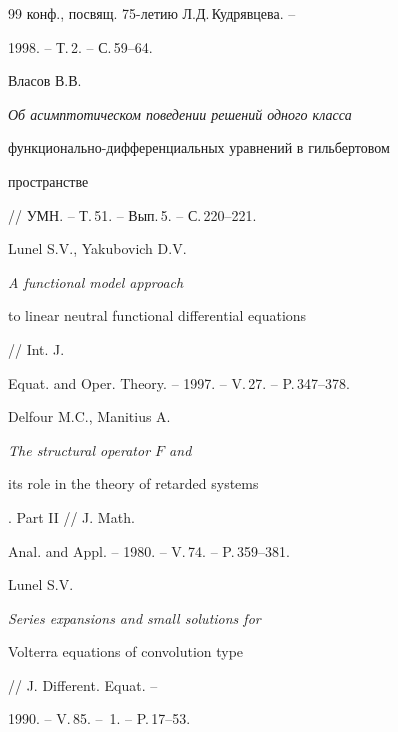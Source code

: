 \begin{thebibliography}{99}
конф., посвящ. 75-летию Л.Д.\,Куд\-ряв\-цева. -- 


1998. -- Т.\,2. -- С.\,59--64. 




Власов В.В. {\em Об асимптотическом поведении решений одного класса 


функционально-дифференциальных уравнений в гильбертовом 


пространстве} // УМН. -- Т.\,51. -- Вып.\,5. -- С.\,220--221. 




Lunel S.V., Yakubovich D.V. {\em A functional model approach 


to linear neutral functional differential equations} // Int. J.


Equat. and Oper. Theory. -- 1997. -- V.\,27. -- P.\,347--378. 




Delfour M.C., Manitius A. {\em The structural operator $F$ and 


its role in the theory of retarded systems}. Part II // J. Math. 


Anal. and Appl. -- 1980. -- V.\,74. -- P.\,359--381. 




Lunel S.V. {\em Series expansions and small solutions for 


Volterra equations of convolution type} // J. Different. Equat. -- 


1990. -- V.\,85. -- \No\,1. -- P.\,17--53. 


 


\end{thebibliography} 


 


\vskip 1cm 


 






 


\label{end} 


 



